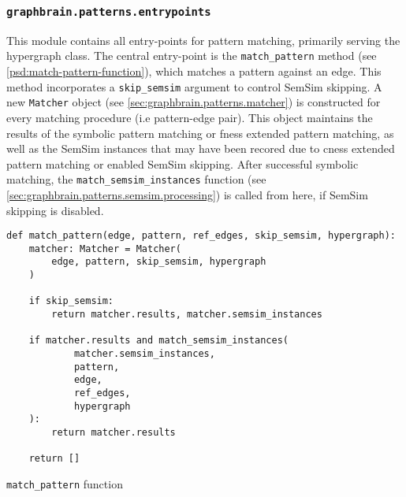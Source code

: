\documentclass[11pt, numbers=noenddot]{scrreprt}
\begin{document}
\subsubsection{\texttt{graphbrain.patterns.entrypoints}}
\label{sec:graphbrain.patterns.entrypoints}
This module contains all entry-points for pattern matching, primarily serving the hypergraph class. The central entry-point is the \texttt{match\_pattern} method (see \cref{psd:match-pattern-function}), which matches a pattern against an edge. This method incorporates a \texttt{skip\_semsim} argument to control SemSim skipping. A new \texttt{Matcher} object (see \cref{sec:graphbrain.patterns.matcher}) is constructed for every matching procedure (i.e pattern-edge pair). This object maintains the results of the symbolic pattern matching or \gls{fness} extended pattern matching, as well as the SemSim instances that may have been recored due to \gls{cness} extended pattern matching or enabled SemSim skipping. After successful symbolic matching, the \texttt{match\_semsim\_instances} function (see \cref{sec:graphbrain.patterns.semsim.processing}) is called from here, if SemSim skipping is disabled. 



\begin{pseudo}
\begin{lstlisting}
def match_pattern(edge, pattern, ref_edges, skip_semsim, hypergraph):
    matcher: Matcher = Matcher(
        edge, pattern, skip_semsim, hypergraph
    )

    if skip_semsim:
        return matcher.results, matcher.semsim_instances

    if matcher.results and match_semsim_instances(
            matcher.semsim_instances,
            pattern,
            edge,
            ref_edges,
            hypergraph
    ):
        return matcher.results

    return []
\end{lstlisting}
\caption{\texttt{match\_pattern} function}
\label{psd:match-pattern-function}
\end{pseudo}
\end{document}
